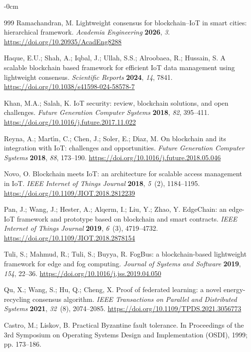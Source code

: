 \documentclass[smartcities,article,submit,moreauthors]{Definitions/mdpi}
\begin{document}
\begin{adjustwidth}{-\extralength}{0cm}
\begin{thebibliography}{999}
Ramachandran, M. Lightweight consensus for blockchain--IoT in smart cities:
hierarchical framework. \emph{Academia Engineering} \textbf{2026}, \emph{3}.
\url{https://doi.org/10.20935/AcadEng8288}

Haque, E.U.; Shah, A.; Iqbal, J.; Ullah, S.S.; Alroobaea, R.; Hussain, S. A
scalable blockchain based framework for efficient IoT data management using
lightweight consensus. \emph{Scientific Reports} \textbf{2024}, \emph{14},
7841.
\url{https://doi.org/10.1038/s41598-024-58578-7}

Khan, M.A.; Salah, K. IoT security: review, blockchain solutions, and open
challenges. \emph{Future Generation Computer Systems} \textbf{2018}, \emph{82},
395--411.
\url{https://doi.org/10.1016/j.future.2017.11.022}

Reyna, A.; Mart\'\i n, C.; Chen, J.; Soler, E.; D\'\i az, M. On blockchain and
its integration with IoT: challenges and opportunities. \emph{Future
Generation Computer Systems} \textbf{2018}, \emph{88}, 173--190.
\url{https://doi.org/10.1016/j.future.2018.05.046}

Novo, O. Blockchain meets IoT: an architecture for scalable access management
in IoT. \emph{IEEE Internet of Things Journal} \textbf{2018}, \emph{5}~(2),
1184--1195.
\url{https://doi.org/10.1109/JIOT.2018.2812239}

Pan, J.; Wang, J.; Hester, A.; Alqerm, I.; Liu, Y.; Zhao, Y. EdgeChain: an
edge-IoT framework and prototype based on blockchain and smart contracts.
\emph{IEEE Internet of Things Journal} \textbf{2019}, \emph{6}~(3),
4719--4732.
\url{https://doi.org/10.1109/JIOT.2018.2878154}

Tuli, S.; Mahmud, R.; Tuli, S.; Buyya, R. FogBus: a blockchain-based
lightweight framework for edge and fog computing. \emph{Journal of Systems and
Software} \textbf{2019}, \emph{154}, 22--36.
\url{https://doi.org/10.1016/j.jss.2019.04.050}

Qu, X.; Wang, S.; Hu, Q.; Cheng, X. Proof of federated learning: a novel
energy-recycling consensus algorithm. \emph{IEEE Transactions on Parallel and
Distributed Systems} \textbf{2021}, \emph{32}~(8), 2074--2085.
\url{https://doi.org/10.1109/TPDS.2021.3056773}

Castro, M.; Liskov, B. Practical Byzantine fault tolerance. In Proceedings of
the 3rd Symposium on Operating Systems Design and Implementation (OSDI), 1999;
pp. 173--186.


\end{thebibliography}
\end{adjustwidth}
\end{document}
